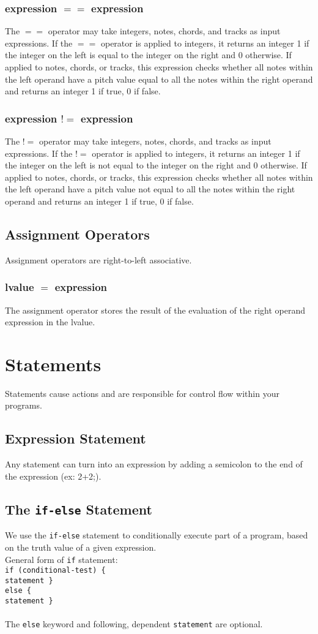 \documentclass[letterpaper]{article}
\begin{document}
\subsubsection{expression $==$ expression}
The $==$ operator may take integers, notes, chords, and tracks as input expressions. If the $==$ operator is applied to integers, it returns an integer 1 if the integer on the left is equal to the integer on the right and 0 otherwise. If applied to notes, chords, or tracks, this expression checks whether all notes within the left operand have a pitch value equal to all the notes within the right operand and returns an integer 1 if true, 0 if false.
\subsubsection{expression $!=$ expression}
The $!=$ operator may take integers, notes, chords, and tracks as input expressions. If the $!=$ operator is applied to integers, it returns an integer 1 if the integer on the left is not equal to the integer on the right and 0 otherwise. If applied to notes, chords, or tracks, this expression checks whether all notes within the left operand have a pitch value not equal to all the notes within the right operand and returns an integer 1 if true, 0 if false.
\subsection{Assignment Operators}
Assignment operators are right-to-left associative.
\subsubsection{lvalue $=$ expression}
The assignment operator stores the result of the evaluation of the right operand expression in the lvalue. 

\section{Statements}
Statements cause actions and are responsible for control flow within your programs.
\subsection{Expression Statement}
Any statement can turn into an expression by adding a semicolon to the end of the expression (ex: 2+2;). 
\subsection{The \texttt{if-else} Statement}
We use the \texttt{if-else} statement to conditionally execute part of a program, based on the truth value of a given expression.\\
General form of \texttt{if} statement:  \\
\texttt{if (conditional-test) \{ \\
statement \} \\
else \{ \\
statement \} } \\ \\
The \texttt{else} keyword and following, dependent \texttt{statement} are optional.
\end{document}
